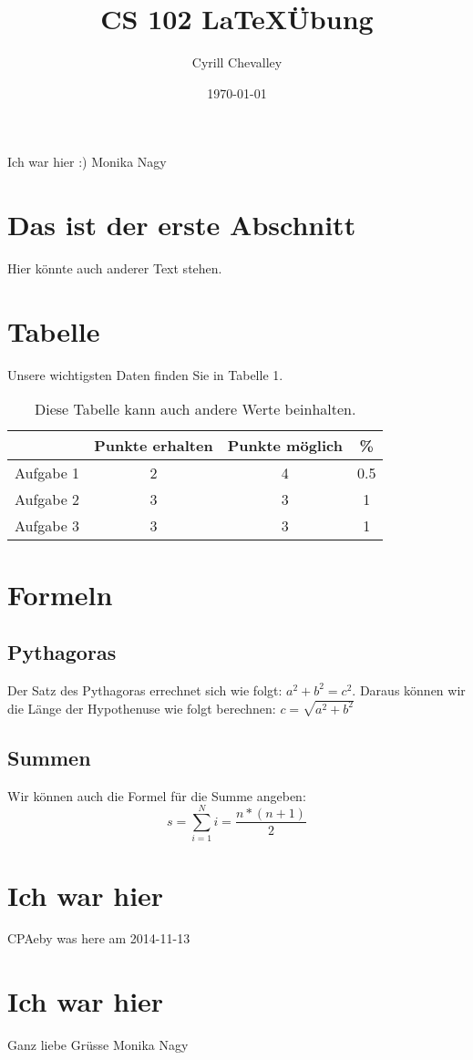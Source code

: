 \documentclass[11pt,a4paper]{article}
\title{CS 102 \LaTeX Übung}
\author{Cyrill Chevalley}
\date{\today}
\begin{document}
\maketitle

Ich war hier :) Monika Nagy

\section{Das ist der erste Abschnitt}
Hier könnte auch anderer Text stehen.

\section{Tabelle}
Unsere wichtigsten Daten finden Sie in Tabelle 1.
	\begin{table}[h]
	\begin{centering}
	\begin{tabular}{c|c|c|c}
	&Punkte erhalten&Punkte möglich& \% \\
	\hline
	Aufgabe 1&2&4&0.5 \\
	Aufgabe 2&3&3&1 \\
	Aufgabe 3&3&3&1 \\
	\end{tabular}
	\caption{Diese Tabelle kann auch andere Werte beinhalten.}
	\end{centering}
	\end{table}
	
\section{Formeln}
\subsection{Pythagoras}
Der Satz des Pythagoras errechnet sich wie folgt: $a^{2} + b^2 = c^2$.
Daraus können wir die Länge der Hypothenuse wie folgt berechnen: 
$c = \sqrt{a^2 + b^2} $

\subsection{Summen}	
Wir können auch die Formel für die Summe angeben:
\begin{equation}
s=\sum \limits_{i=1}^{N} i = \frac{n \ast (n+1)}{2}
\end{equation}


\section{Ich war hier}
CPAeby was here am 2014-11-13


\section{Ich war hier}
Ganz liebe Gr\"usse Monika Nagy
\end{document}
